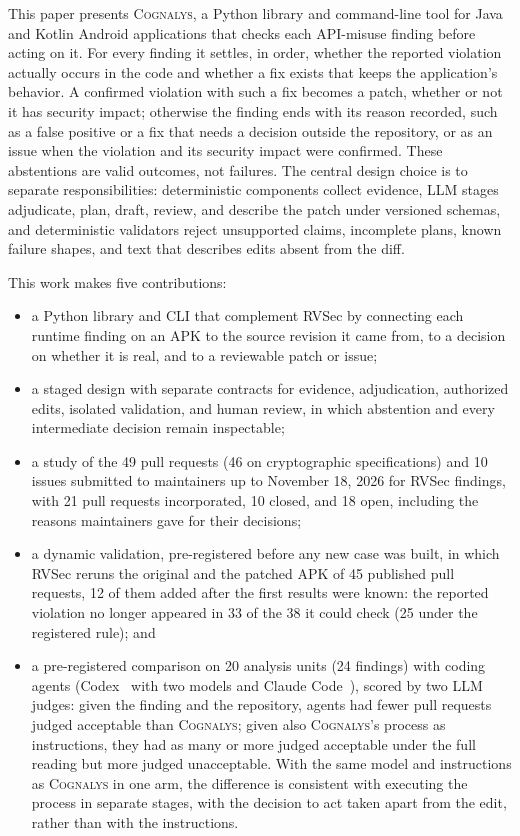 \documentclass[conference]{IEEEtran}
\newcommand{\system}{\textsc{Cognalys}}
\begin{document}
This paper presents \system, a Python library and command-line tool for Java
and Kotlin Android applications that checks each API-misuse finding before
acting on it. For every finding it settles, in order, whether the reported
violation actually occurs in the code and whether a fix exists that keeps the
application's behavior. A confirmed violation with such a fix becomes a patch,
whether or not it has security impact; otherwise the finding ends with its
reason recorded, such as a false positive or a fix that needs a decision
outside the repository, or as an issue when the violation and its security
impact were confirmed. These abstentions are valid outcomes, not failures. The
central design choice is to separate responsibilities: deterministic
components collect evidence, LLM stages adjudicate, plan, draft, review, and
describe the patch under versioned schemas, and deterministic validators
reject unsupported claims, incomplete plans, known failure shapes, and text
that describes edits absent from the diff.

This work makes five contributions:
\begin{itemize}
  \item a Python library and CLI that complement RVSec by connecting each
  runtime finding on an APK to the source revision it came from, to a decision
  on whether it is real, and to a reviewable patch or issue;
  \item a staged design with separate contracts for evidence, adjudication,
  authorized edits, isolated validation, and human review, in which abstention
  and every intermediate decision remain inspectable;
  \item a study of the 49 pull requests (46 on cryptographic specifications)
  and 10 issues submitted to maintainers up to November 18, 2026 for RVSec
  findings, with 21 pull requests incorporated, 10 closed, and 18 open,
  including the reasons maintainers gave for their decisions;
  \item a dynamic validation, pre-registered before any new case was built, in
  which RVSec reruns the original and the patched APK of 45 published pull
  requests, 12 of them added after the first results were known: the reported violation no longer appeared in 33 of the 38 it
  could check (25 under the registered rule); and
  \item a pre-registered comparison on 20 analysis units (24 findings) with
  coding agents (Codex~\cite{openai2026codex} with two models and Claude Code~\cite{anthropic2026claudecode}), scored by two LLM
  judges: given the finding and the repository, agents had fewer pull requests
  judged acceptable than \system{}; given also \system{}'s process as
  instructions, they had as many or more judged acceptable under the full reading
  but more judged unacceptable. With the same model and instructions as
  \system{} in one arm, the difference is consistent with executing the process
  in separate stages, with the decision to act taken apart from the edit,
  rather than with the instructions.
\end{itemize}
\end{document}
